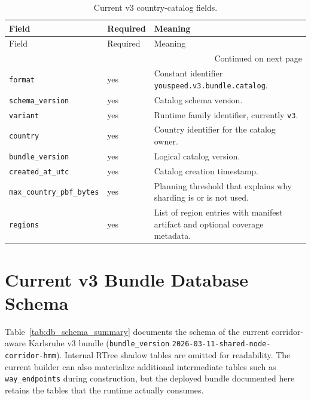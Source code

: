 \documentclass{article}
\begin{document}
{\scriptsize
\begin{longtable}{@{}p{3.5cm}p{1.1cm}p{6.6cm}@{}}
\caption{Current v3 country-catalog fields.}
\label{tab:contract_catalog}\\
\toprule
Field & Required & Meaning \\
\midrule
\endfirsthead
\toprule
Field & Required & Meaning \\
\midrule
\endhead
\midrule
\multicolumn{3}{r}{Continued on next page} \\
\midrule
\endfoot
\bottomrule
\endlastfoot
\nolinkurl{format} & yes & Constant identifier \nolinkurl{youspeed.v3.bundle.catalog}. \\
\nolinkurl{schema_version} & yes & Catalog schema version. \\
\nolinkurl{variant} & yes & Runtime family identifier, currently \nolinkurl{v3}. \\
\nolinkurl{country} & yes & Country identifier for the catalog owner. \\
\nolinkurl{bundle_version} & yes & Logical catalog version. \\
\nolinkurl{created_at_utc} & yes & Catalog creation timestamp. \\
\nolinkurl{max_country_pbf_bytes} & yes & Planning threshold that explains why sharding is or is not used. \\
\nolinkurl{regions} & yes & List of region entries with manifest artifact and optional coverage metadata. \\
\end{longtable}
}

\section{Current v3 Bundle Database Schema}
Table~\ref{tab:db_schema_summary} documents the schema of the current corridor-aware Karlsruhe v3 bundle (\texttt{bundle\_version} \texttt{2026-03-11-shared-node-corridor-hmm}). Internal RTree shadow tables are omitted for readability. The current builder can also materialize additional intermediate tables such as \texttt{way\_endpoints} during construction, but the deployed bundle documented here retains the tables that the runtime actually consumes.
\end{document}
